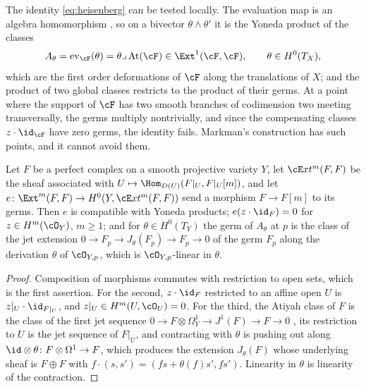 The identity \eqref{eq:heisenberg} can be tested locally. The evaluation map
is an algebra homomorphism \cite[(8.3.3)]{Mar25a}, so on a bivector
$\theta\wedge\theta'$ it is the Yoneda product of the classes
\[
  A_{\theta}=\operatorname{ev}_{\cF}(\theta)=\theta\lrcorner\,\mathrm{At}(\cF)
  \in\Ext^{1}(\cF,\cF),\qquad\theta\in H^{0}(T_{X}),
\]
which are the first order deformations of $\cF$ along the translations of
$X$; and the product of two global classes restricts to the product of their
germs. At a point where the support of $\cF$ has two smooth branches of
codimension two meeting transversally, the germs multiply nontrivially, and
since the compensating classes $z\cdot\id_{\cF}$ have zero germs, the
identity fails. Markman's construction has such points, and it cannot avoid
them.

\begin{lemma}[Localisation]\label{lem:edge}
Let $F$ be a perfect complex on a smooth projective variety $Y$, let
$\cE xt^{m}(F,F)$ be the sheaf associated with $U\mapsto\Hom_{D(U)}(F|_{U},F|_{U}[m])$,
and let $e\colon\Ext^{m}(F,F)\to H^{0}(Y,\cE xt^{m}(F,F))$ send a morphism
$F\to F[m]$ to its germs. Then $e$ is compatible with Yoneda products;
$e(z\cdot\id_{F})=0$ for $z\in H^{m}(\cO_{Y})$, $m\ge1$; and for
$\theta\in H^{0}(T_{Y})$ the germ of $A_{\theta}$ at $p$ is the class of the
jet extension $0\to F_{p}\to J_{\theta}(F_{p})\to F_{p}\to0$ of the germ
$F_{p}$ along the derivation $\theta$ of $\cO_{Y,p}$, which is
$\cO_{Y,p}$-linear in $\theta$.
\end{lemma}

\begin{proof}
Composition of morphisms commutes with restriction to open sets, which is the
first assertion. For the second, $z\cdot\id_{F}$ restricted to an affine open
$U$ is $z|_{U}\cdot\id_{F|_{U}}$, and $z|_{U}\in H^{m}(U,\cO_{U})=0$. For the
third, the Atiyah class of $F$ is the class of the first jet sequence
$0\to F\otimes\Omega^{1}_{Y}\to J^{1}(F)\to F\to0$ \cite[Section 3]{BF03},
its restriction to $U$ is the jet sequence of $F|_{U}$, and contracting with
$\theta$ is pushing out along $\id\otimes\theta\colon F\otimes\Omega^{1}\to F$,
which produces the extension $J_{\theta}(F)$ whose underlying sheaf is
$F\oplus F$ with $f\cdot(s,s')=(fs+\theta(f)s',fs')$. Linearity in $\theta$
is linearity of the contraction.
\end{proof}

